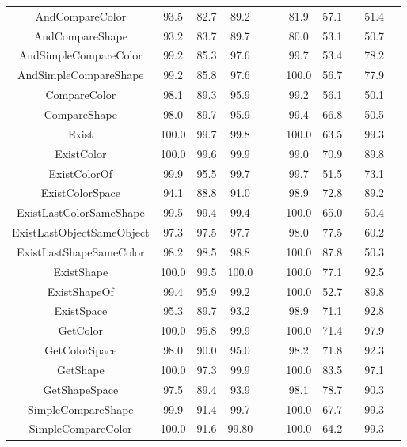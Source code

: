 \begin{table}[t]
{\begin{tabular}{ccccccccccc}
		
		AndCompareColor	&	93.5		&	82.7	&	89.2	&&		&81.9	&57.1&&	51.4
		\\ 
		AndCompareShape	&	93.2 		&	83.7	&	89.7	&&	&	80.0	&53.1	&&50.7\\ 
		AndSimpleCompareColor	&	99.2	&		85.3	&	97.6	&	&	&99.7&	53.4&&	78.2\\ 
		AndSimpleCompareShape	&	99.2&			85.8	&	97.6	&&	&	100.0	&56.7&&	77.9\\ 
		CompareColor	&	98.1		&	89.3	&	95.9	&&		&99.2&	56.1&&	50.1\\ 
		CompareShape	&	98.0	&		89.7	&	95.9	&&	&99.4	&66.8	&&50.5
		\\ 
		Exist	&	100.0	&		99.7	&	99.8		&&	&	100.0&	63.5&&	99.3\\ 
		ExistColor	&	100.0		&	99.6	&	99.9	&&	&	99.0&	70.9&&	89.8\\ 
		ExistColorOf	&	99.9	&		95.5	&	99.7		& & &	99.7&	51.5&&	73.1\\ 
		ExistColorSpace	&94.1		&	88.8	&	91.0	&& &	98.9	&72.8	&&89.2\\ 
		ExistLastColorSameShape	&	99.5		&	99.4	&99.4	&&		&100.0	&65.0&&	50.4
		\\ 
		ExistLastObjectSameObject	&	97.3	&		97.5	&	97.7	&&	&	98.0&	77.5	&&60.2\\ 
		ExistLastShapeSameColor	&	98.2		&	98.5&	98.8	&&	&	100.0&	87.8&&	50.3\\ 
		ExistShape	&	100.0	&	99.5	&	100.0	&&&	100.0&	77.1	&&92.5\\ 
		ExistShapeOf	&	99.4		&	95.9	&	99.2	&&&100.0	&52.7&&89.8\\ 
		ExistSpace	&	95.3	&	89.7	&	93.2	&&		&	98.9	&71.1	&&92.8\\ 
		GetColor	&	100.0		&	95.8&	99.9	&& &	100.0&	71.4&&	97.9\\ 
		GetColorSpace	&	98.0		&	90.0	&	95.0&	& &	98.2	&71.8&&	92.3\\ 
		GetShape	&	100.0		&	97.3&	99.9&	&	&	100.0  &83.5&&	97.1
		\\ 
		GetShapeSpace	&	97.5	&	89.4	&	93.9	&&&	98.1  &78.7	&&	90.3\\ 
		SimpleCompareShape	&	99.9		&	91.4	&	99.7	&	&&	100.0 & 67.7&&	99.3\\ 
		SimpleCompareColor	&	100.0 		&	91.6  &	99.80&	&	&	100.0&	64.2&&	99.3	  \\ 
		
		
		
		
		
		
		
		\bottomrule
	\end{tabular}
}

	\label{results}
\end{table}



